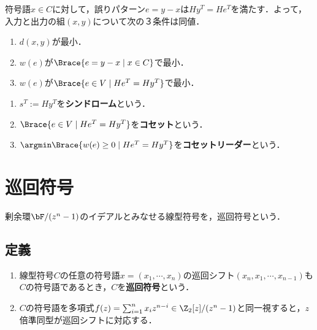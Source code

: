 \documentclass[uplatex,dvipdfmx]{jsreport}
\begin{document}
\begin{discussion}[線型符号の最尤復号]
    符号語$x\in C$に対して，誤りパターン$e=y-x$は$Hy^T=He^T$を満たす．よって，入力と出力の組$(x,y)$について次の３条件は同値．
    \begin{enumerate}
        \item $d(x,y)$が最小．
        \item $w(e)$が$\Brace{e=y-x\mid x\in C}$で最小．
        \item $w(e)$が$\Brace{e\in V\mid He^T=Hy^T}$で最小．
    \end{enumerate}
\end{discussion}

\begin{definition}\mbox{}
    \begin{enumerate}
        \item $s^T:=Hy^T$を\textbf{シンドローム}という．
        \item $\Brace{e\in V\mid He^T=Hy^T}$を\textbf{コセット}という．
        \item $\argmin\Brace{w(e)\ge 0\mid He^T=Hy^T}$を\textbf{コセットリーダー}という．
    \end{enumerate}
\end{definition}

\section{巡回符号}

\begin{tcolorbox}[colframe=ForestGreen, colback=ForestGreen!10!white,breakable,colbacktitle=ForestGreen!40!white,coltitle=black,fonttitle=\bfseries\sffamily,
title=]
    剰余環$\bF/(z^n-1)$のイデアルとみなせる線型符号を，巡回符号という．
\end{tcolorbox}

\subsection{定義}

\begin{definition}\mbox{}
    \begin{enumerate}
        \item 線型符号$C$の任意の符号語$x=(x_1,\cdots,x_n)$の巡回シフト$(x_n,x_1,\cdots,x_{n-1})$も$C$の符号語であるとき，$C$を\textbf{巡回符号}という．
        \item $C$の符号語を多項式$f(z)=\sum^n_{i=1}x_iz^{n-i}\in\Z_2[z]/(z^n-1)$と同一視すると，$z$倍準同型が巡回シフトに対応する．
    \end{enumerate}
\end{definition}
\end{document}
